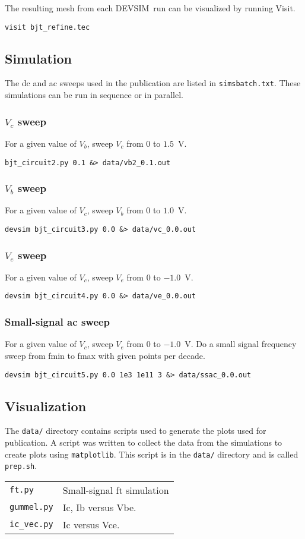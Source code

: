 \documentclass[11pt]{article}
\newcommand{\devsim}{\mbox{DEVSIM}}
\begin{document}
The resulting mesh from each \devsim\ run can be visualized by running Visit.
\begin{verbatim}
visit bjt_refine.tec
\end{verbatim}
\subsection{Simulation}
The dc and ac sweeps used in the publication are listed in \texttt{simsbatch.txt}.  These simulations can be run in sequence or in parallel.

\subsubsection{$V_c$ sweep}
For a given value of $V_b$, sweep $V_c$ from $0$ to $1.5$~V.
\begin{verbatim}
bjt_circuit2.py 0.1 &> data/vb2_0.1.out
\end{verbatim}

\subsubsection{$V_b$ sweep}
For a given value of $V_c$, sweep $V_b$ from $0$ to $1.0$~V.
\begin{verbatim}
devsim bjt_circuit3.py 0.0 &> data/vc_0.0.out
\end{verbatim}

\subsubsection{$V_e$ sweep}
For a given value of $V_c$, sweep $V_e$ from $0$ to $-1.0$~V.
\begin{verbatim}
devsim bjt_circuit4.py 0.0 &> data/ve_0.0.out
\end{verbatim}

\subsubsection{Small-signal ac sweep}
For a given value of $V_c$, sweep $V_e$ from $0$ to $-1.0$~V.  Do a small signal frequency sweep from fmin to fmax with given points per decade.
\begin{verbatim}
devsim bjt_circuit5.py 0.0 1e3 1e11 3 &> data/ssac_0.0.out
\end{verbatim}

\subsection{Visualization}
The \texttt{data/} directory contains scripts used to generate the plots used for publication.  A script was written to collect the data from the simulations to create plots using \texttt{matplotlib}.  This script is in the \texttt{data/} directory and is called \texttt{prep.sh}.  

\begin{tabular}{ll}
\texttt{ft.py} & Small-signal ft simulation\\
\texttt{gummel.py} & Ic, Ib versus Vbe.\\
\texttt{ic\_vec.py} & Ic versus Vce.\\
\end{tabular}
\end{document}
